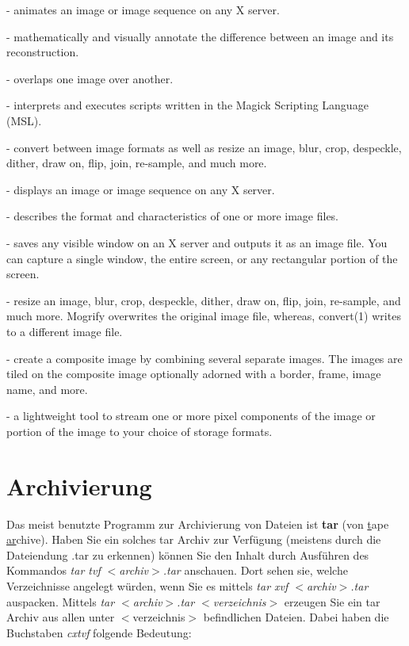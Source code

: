 \documentclass[titlepage,a4paper]{article}
\begin{document}
\begin{description}
\setlength{\itemsep}{0pt}
\item[animate] - animates an image or image sequence on any X server.
\item[compare] - mathematically and visually annotate the difference between an image
                 and its reconstruction.
\item[composite] - overlaps one image over another.
\item[conjure] - interprets and executes scripts written in the Magick Scripting Language (MSL).
\item[convert] - convert between image formats as well as resize an image, blur, crop,
                 despeckle, dither, draw on, flip, join, re-sample, and much more.
\item[display] - displays an image or image sequence on any X server.
\item[identify] - describes the format and characteristics of one or more image files.
\item[import] - saves any visible window on an X server and outputs it as an image file.
                You can capture a single window, the entire screen, or any rectangular portion of the screen.
\item[mogrify] - resize an image, blur, crop, despeckle, dither, draw on, flip, join, re-sample, and much more.
                 Mogrify overwrites the original image file, whereas, convert(1) writes to a different image file.
\item[montage] - create  a  composite image by combining several separate images. The images are tiled on the composite image
                 optionally adorned with a border, frame, image name, and more.
\item[stream] - a lightweight tool to stream one or more pixel components of the image or portion of the image to your choice
                of storage formats.
\end{description}


\section{Archivierung}

Das meist benutzte Programm zur Archivierung von Dateien ist \textbf{tar} (von
\underline{t}ape \underline{ar}chive).  Haben Sie ein solches tar Archiv zur
Verfügung (meistens durch die Dateiendung .tar zu erkennen) können Sie den
Inhalt durch Ausführen des Kommandos \emph{tar tvf $<$archiv$>$.tar} anschauen.
Dort sehen sie, welche Verzeichnisse angelegt würden, wenn Sie es mittels
\emph{tar xvf $<$archiv$>$.tar} auspacken.  Mittels \emph{tar $<$archiv$>$.tar
  $<$verzeichnis$>$} erzeugen Sie ein tar Archiv aus allen unter
$<$verzeichnis$>$ 
befindlichen Dateien.  Dabei haben die Buchstaben \emph{cxtvf} folgende
Bedeutung: 
\end{document}
